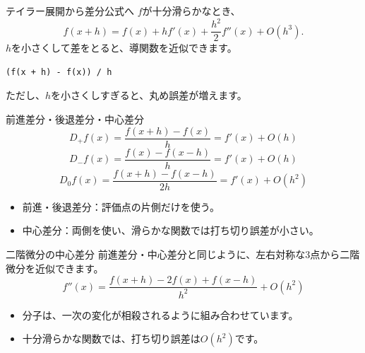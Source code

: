 \documentclass[12pt,aspectratio=43]{beamer}
\begin{document}
\begin{frame}[t,fragile]{テイラー展開から差分公式へ}
  \vspace*{\fill}
  $f$が十分滑らかなとき、
  \[
    f(x+h)=f(x)+hf'(x)+\frac{h^2}{2}f''(x)+O(h^3).
  \]
  $h$を小さくして差をとると、導関数を近似できます。
\begin{lstlisting}
(f(x + h) - f(x)) / h
\end{lstlisting}
  \vspace{1mm}
  ただし、$h$を小さくしすぎると、丸め誤差が増えます。
  \vfill
\end{frame}

\begin{frame}[t]{前進差分・後退差分・中心差分}
  \setlength{\parskip}{1mm}
  \[
    D_+f(x)=\frac{f(x+h)-f(x)}{h}=f'(x)+O(h)
  \]
  \[
    D_-f(x)=\frac{f(x)-f(x-h)}{h}=f'(x)+O(h)
  \]
  \[
    D_0f(x)=\frac{f(x+h)-f(x-h)}{2h}=f'(x)+O(h^2)
  \]
  \begin{itemize}
    \item 前進・後退差分：評価点の片側だけを使う。
    \item 中心差分：両側を使い、滑らかな関数では打ち切り誤差が小さい。
  \end{itemize}
\end{frame}

\begin{frame}[t]{二階微分の中心差分}
  前進差分・中心差分と同じように、左右対称な3点から二階微分を近似できます。
  \[
    f''(x)=\frac{f(x+h)-2f(x)+f(x-h)}{h^2}+O(h^2)
  \]
  \begin{itemize}
    \item 分子は、一次の変化が相殺されるように組み合わせています。
    \item 十分滑らかな関数では、打ち切り誤差は$O(h^2)$です。
  \end{itemize}
\end{frame}
\end{document}
